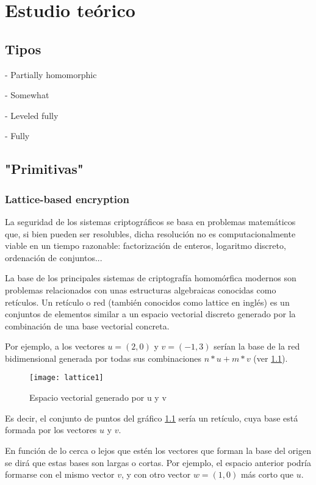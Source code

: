 \chapter{Estudio teórico}

\section{Tipos}

- Partially homomorphic

- Somewhat

- Leveled fully

- Fully

\section{"Primitivas"}

\subsection{Lattice-based encryption}

La seguridad de los sistemas criptográficos se basa en problemas matemáticos que, si bien pueden ser resolubles, dicha resolución no es computacionalmente viable en un tiempo razonable: factorización de enteros, logaritmo discreto, ordenación de conjuntos...

La base de los principales sistemas de criptografía homomórfica modernos son problemas relacionados con unas estructuras algebraicas conocidas como retículos. Un retículo o red (también conocidos como lattice en inglés) es un conjuntos de elementos similar a un espacio vectorial discreto generado por la combinación de una base vectorial concreta.

Por ejemplo, a los vectores $u = (2, 0)$ y $v = (-1, 3)$ serían la base de la red bidimensional generada por todas sus combinaciones $n*u + m*v$ (ver \ref{fig:lattice1}).

\begin{figure}[h]
  \caption{Espacio vectorial generado por u y v}
  \label{fig:lattice1}
  \texttt{[image: lattice1]}
\end{figure}

Es decir, el conjunto de puntos del gráfico \ref{fig:lattice1} sería un retículo, cuya base está formada por los vectores $u$ y $v$.

En función de lo cerca o lejos que estén los vectores que forman la base del origen se dirá que estas bases son largas o cortas\cite{wickr_what_2018}. Por ejemplo, el espacio anterior podría formarse con el mismo vector $v$, y con otro vector $w = (1, 0)$ más corto que $u$.

